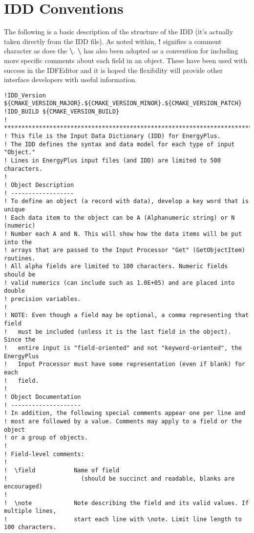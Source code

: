\section{IDD Conventions}\label{idd-conventions}

The following is a basic description of the structure of the IDD (it's actually taken directly from the IDD file). As noted within, \textbf{!} signifies a comment character as does the \textbf{\textbackslash{}}. \textbf{\textbackslash{}} has also been adopted as a convention for including more specific comments about each field in an object. These have been used with success in the IDFEditor and it is hoped the flexibility will provide other interface developers with useful information.

\begin{lstlisting}
!IDD_Version ${CMAKE_VERSION_MAJOR}.${CMAKE_VERSION_MINOR}.${CMAKE_VERSION_PATCH}
!IDD_BUILD ${CMAKE_VERSION_BUILD}
! **************************************************************************
! This file is the Input Data Dictionary (IDD) for EnergyPlus.
! The IDD defines the syntax and data model for each type of input "Object."
! Lines in EnergyPlus input files (and IDD) are limited to 500 characters.
!
! Object Description
! ------------------
! To define an object (a record with data), develop a key word that is unique
! Each data item to the object can be A (Alphanumeric string) or N (numeric)
! Number each A and N. This will show how the data items will be put into the
! arrays that are passed to the Input Processor "Get" (GetObjectItem) routines.
! All alpha fields are limited to 100 characters. Numeric fields should be
! valid numerics (can include such as 1.0E+05) and are placed into double
! precision variables.
!
! NOTE: Even though a field may be optional, a comma representing that field
!   must be included (unless it is the last field in the object). Since the
!   entire input is "field-oriented" and not "keyword-oriented", the EnergyPlus
!   Input Processor must have some representation (even if blank) for each
!   field.
!
! Object Documentation
! --------------------
! In addition, the following special comments appear one per line and
! most are followed by a value. Comments may apply to a field or the object
! or a group of objects.
!
! Field-level comments:
!
!  \field           Name of field
!                     (should be succinct and readable, blanks are encouraged)
!
!  \note            Note describing the field and its valid values. If multiple lines,
!                   start each line with \note. Limit line length to 100 characters.

\end{lstlisting}
